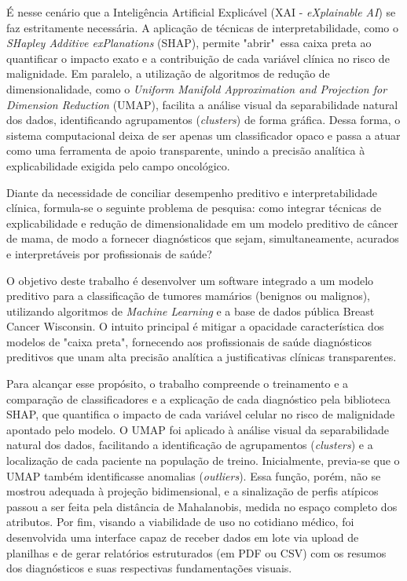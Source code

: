 \documentclass[
    12pt
    ,oneside
    ,a4paper
    ,chapter=TITLE
    ,section=TITLE
    ,sumario=abnt-6027-2012
    ,english,brazil]{abntex2} %
\begin{document}
É nesse cenário que a Inteligência Artificial Explicável (XAI - \textit{eXplainable AI}) se faz estritamente necessária. A aplicação de técnicas de interpretabilidade, como o \textit{SHapley Additive exPlanations} (SHAP), permite "abrir"\ essa caixa preta ao quantificar o impacto exato e a contribuição de cada variável clínica no risco de malignidade. Em paralelo, a utilização de algoritmos de redução de dimensionalidade, como o \textit{Uniform Manifold Approximation and Projection for Dimension Reduction} (UMAP), facilita a análise visual da separabilidade natural dos dados, identificando agrupamentos (\textit{clusters}) de forma gráfica. Dessa forma, o sistema computacional deixa de ser apenas um classificador opaco e passa a atuar como uma ferramenta de apoio transparente, unindo a precisão analítica à explicabilidade exigida pelo campo oncológico.

Diante da necessidade de conciliar desempenho preditivo e interpretabilidade clínica, formula-se o seguinte problema de pesquisa: como integrar técnicas de explicabilidade e redução de dimensionalidade em um modelo preditivo de câncer de mama, de modo a fornecer diagnósticos que sejam, simultaneamente, acurados e interpretáveis por profissionais de saúde?

O objetivo deste trabalho é desenvolver um software integrado a um modelo preditivo para a classificação de tumores mamários (benignos ou malignos), utilizando algoritmos de \textit{Machine Learning} e a base de dados pública Breast Cancer Wisconsin. O intuito principal é mitigar a opacidade característica dos modelos de "caixa preta", fornecendo aos profissionais de saúde diagnósticos preditivos que unam alta precisão analítica a justificativas clínicas transparentes.

Para alcançar esse propósito, o trabalho compreende o treinamento e a comparação de classificadores e a explicação de cada diagnóstico pela biblioteca SHAP, que quantifica o impacto de cada variável celular no risco de malignidade apontado pelo modelo. O UMAP foi aplicado à análise visual da separabilidade natural dos dados, facilitando a identificação de agrupamentos (\textit{clusters}) e a localização de cada paciente na população de treino. Inicialmente, previa-se que o UMAP também identificasse anomalias (\textit{outliers}). Essa função, porém, não se mostrou adequada à projeção bidimensional, e a sinalização de perfis atípicos passou a ser feita pela distância de Mahalanobis, medida no espaço completo dos atributos. Por fim, visando a viabilidade de uso no cotidiano médico, foi desenvolvida uma interface capaz de receber dados em lote via upload de planilhas e de gerar relatórios estruturados (em PDF ou CSV) com os resumos dos diagnósticos e suas respectivas fundamentações visuais.
\end{document}
